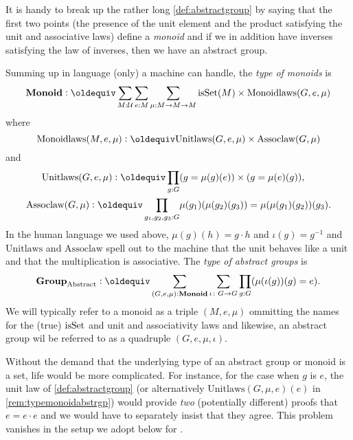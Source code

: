   \begin{remark}
    It is handy to break up the rather long \cref{def:abstractgroup}  by saying that the first two points (\ie the presence of the unit element and the product satisfying the unit and associative laws) define a \emph{monoid} and if we in addition have inverses satisfying the law of inverses, then we have an abstract group.
    \end{remark}


    \begin{remark}\label{rem:typemonoidabstrgp}
        Summing up in language (only) a machine can handle, the \emph{type of monoids} is
$$\typemonoid\defequi \sum_{M:\mathcal U}\sum_{e:M}\sum_{\mu{}:M\to M\to M}
\isset{(M)}\times\mathrm{Monoidlaws}(G,e,\mu)
$$
where
$$\mathrm{Monoidlaws}(M,e,\mu)\defequi\mathrm{Unitlaws}(G,e,\mu)\times\mathrm{Assoclaw}(G,\mu{})$$and
\begin{align*}
  \mathrm{Unitlaws}(G,e,\mu)\defequi\prod_{g:G}
&(g=\mu{}(g)(e))\times(g=\mu{}(e)(g)),\\
\mathrm{Assoclaw}(G,\mu{})\defequi\prod_{g_1,g_2,g_3:G}&\mu{}(g_1)(\mu{}(g_2)(g_3))=\mu{}(\mu{}(g_1)(g_2))(g_3).
\end{align*}
In the human language we used above, $\mu(g)(h)=g\cdot h$ and $\iota(g)=g^{-1}$ and $\mathrm{Unitlaws}$ and $\mathrm{Assoclaw}$ spell out to the machine that the unit behaves like a unit and that the multiplication is associative.
The
\emph{type of abstract groups} is
$$\typeabsgp\defequi
\sum_{(G,e,\mu):\typemonoid}\sum_{\iota\colon G\to G}\prod_{g:G}(\mu{}(\iota{}(g))(g)=e).$$
We will typically refer to a monoid as a triple $(M,e,\mu)$ ommitting the names for the (true) $\mathrm{isSet}$ and unit and associativity laws and likewise, an abstract group wil be referred to as a quadruple $(G,e,\mu,\iota)$.
\end{remark}
  \begin{remark}
Without the demand that the underlying type of an abstract group or monoid is a set, life would be more complicated.  For instance, for the case when $g$ is $e$, the unit law of \cref{def:abstractgroup} (or alternatively $\mathrm{Unitlaws}(G,\mu{},e)(e)$ in \cref{rem:typemonoidabstrgp}) would provide \emph{two} (potentially different) proofs that $e=e\cdot e$ and we would have to separately insist that they agree.  This problem vanishes in the setup we adopt below for \inftygps.
  \end{remark}

